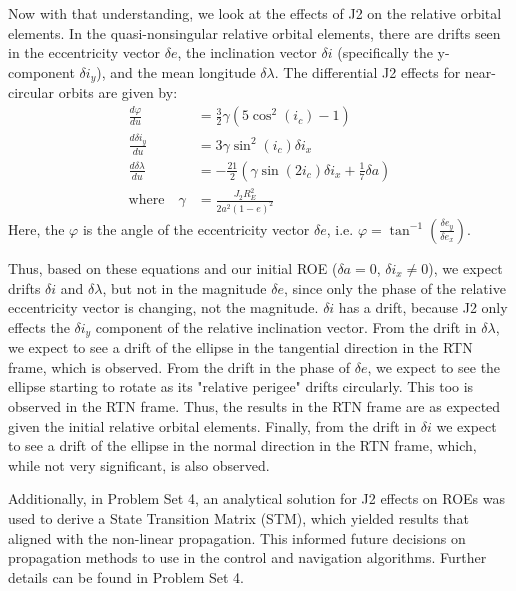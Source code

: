 Now with that understanding, we look at the effects of J2 on the relative orbital elements. In the quasi-nonsingular relative orbital elements, there are drifts seen in the eccentricity vector $\delta e$, the inclination vector $\delta i$ (specifically the y-component $\delta i_y$), and the mean longitude $\delta \lambda$. The differential J2 effects for near-circular orbits are given by:
\begin{align}
    \frac{d \varphi}{d u} &= \frac{3}{2} \gamma (5\cos^2(i_c) - 1) \\
    \frac{d \delta i_y}{d u} &= 3\gamma \sin^2(i_c) \delta i_x \label{eq:drift_in_rel_i} \\
    \frac{d \delta \lambda}{d u} &= -\frac{21}{2}\left(\gamma \sin(2i_c)\delta i_x 
+ \frac{1}{7} \delta a\right) \label{eq:drift_in_lambda_rel}\\
    \text{where} \quad \gamma  &= \frac{J_2 R_E^2}{2 a^2 (1 - e)^2}
\end{align}
Here, the $\varphi$ is the angle of the eccentricity vector $\delta e$, i.e. $\varphi = \tan^{-1}\left(\frac{\delta e_y}{\delta e_x}\right)$.

Thus, based on these equations and our initial ROE ($\delta a = 0$, $\delta i_x \neq 0$), we expect drifts $\delta i$ and $\delta \lambda$, but not in the magnitude $\delta e$, since only the phase of the relative eccentricity vector is changing, not the magnitude. $\delta i$ has a drift, because J2 only effects the $\delta i_y$ component of the relative inclination vector. From the drift in $\delta \lambda$, we expect to see a drift of the ellipse in the tangential direction in the RTN frame, which is observed. From the drift in the phase of $\delta e$, we expect to see the ellipse starting to rotate as its "relative perigee" drifts circularly. This too is observed in the RTN frame. Thus, the results in the RTN frame are as expected given the initial relative orbital elements. Finally, from the drift in $\delta i$ we expect to see a drift of the ellipse in the normal direction in the RTN frame, which, while not very significant, is also observed. 

Additionally, in Problem Set 4, an analytical solution for J2 effects on ROEs was used to derive a State Transition Matrix (STM), which yielded results that aligned with the non-linear propagation. This informed future decisions on propagation methods to use in the control and navigation algorithms. Further details can be found in Problem Set 4. 

